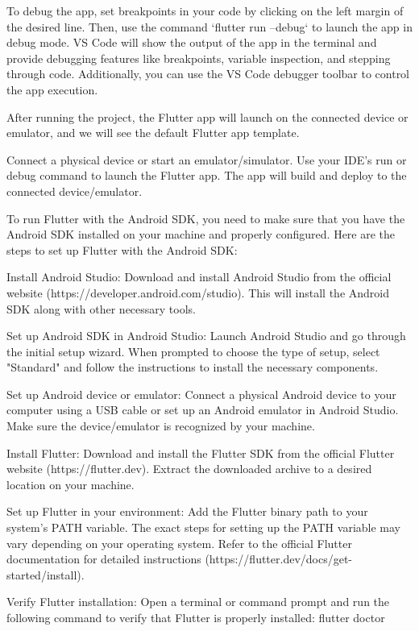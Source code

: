 To debug the app, set breakpoints in your code by clicking on the left margin of the desired line. 
Then, use the command `flutter run --debug` to launch the app in debug mode. VS Code will show the output of the app 
in the terminal and provide debugging features like breakpoints, variable inspection, and stepping through code. 
Additionally, you can use the VS Code debugger toolbar to control the app execution.

After running the project, the Flutter app will launch on the connected device or emulator, and we will see the 
default Flutter app template.


Connect a physical device or start an emulator/simulator.
Use your IDE's run or debug command to launch the Flutter app.
The app will build and deploy to the connected device/emulator.

To run Flutter with the Android SDK, you need to make sure that you have the Android SDK installed on your machine and 
properly configured. Here are the steps to set up Flutter with the Android SDK:

Install Android Studio: Download and install Android Studio from the official website 
(https://developer.android.com/studio). This will install the Android SDK along with other necessary tools.

Set up Android SDK in Android Studio: Launch Android Studio and go through the initial setup wizard. When 
prompted to choose the type of setup, select "Standard" and follow the instructions to install the necessary components.

Set up Android device or emulator: Connect a physical Android device to your computer using a USB cable or set 
up an Android emulator in Android Studio. Make sure the device/emulator is recognized by your machine.

Install Flutter: Download and install the Flutter SDK from the official Flutter website (https://flutter.dev). 
Extract the downloaded archive to a desired location on your machine.

Set up Flutter in your environment: Add the Flutter binary path to your system's PATH variable. The exact steps 
for setting up the PATH variable may vary depending on your operating system. Refer to the official Flutter 
documentation for detailed instructions (https://flutter.dev/docs/get-started/install).

Verify Flutter installation: Open a terminal or command prompt and run the following command to verify that 
Flutter is properly installed: flutter doctor

